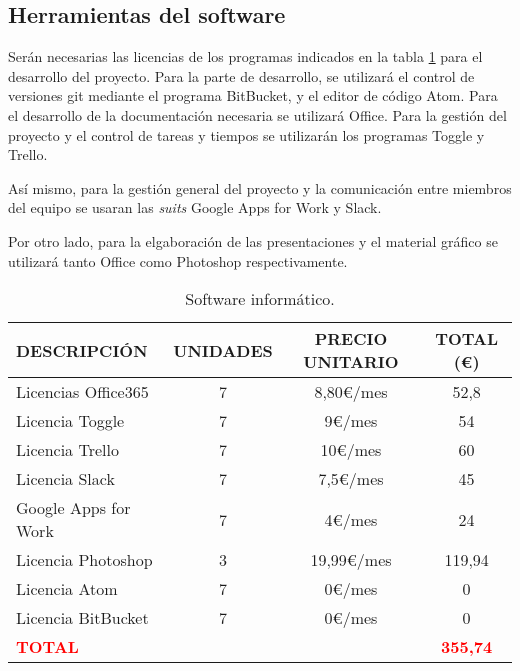 \subsection{Herramientas del software}
\par Serán necesarias las licencias de los programas indicados en la tabla \ref{tab:software} para el desarrollo del proyecto. Para la parte de desarrollo, se utilizará el control de versiones git mediante el programa BitBucket, y el editor de código Atom. Para el desarrollo de la documentación necesaria se utilizará Office. Para la gestión del proyecto y el control de tareas y tiempos se utilizarán los programas Toggle y Trello.
\par Así mismo, para la gestión general del proyecto y la comunicación entre miembros del equipo se usaran las \textit{suits} Google Apps for Work y Slack.
\par Por otro lado, para la elgaboración de las presentaciones y el material gráfico se utilizará tanto Office como Photoshop respectivamente.


\begin{table}[H]
\begin{center}
\begin{tabular}{l c c c}
\textbf{DESCRIPCIÓN} & \textbf{UNIDADES} & \textbf{PRECIO UNITARIO} & \textbf{TOTAL (\euro)}\\ \hline \hline
Licencias Office365 & 7 & 8,80\euro/mes & 52,8\\
Licencia Toggle & 7 & 9\euro/mes & 54\\
Licencia Trello & 7 & 10\euro/mes & 60\\
Licencia Slack & 7 & 7,5\euro/mes & 45\\
Google Apps for Work & 7 & 4\euro/mes & 24\\
Licencia Photoshop & 3 & 19,99\euro/mes & 119,94\\
Licencia Atom & 7 & 0\euro/mes & 0\\
Licencia BitBucket & 7 & 0\euro/mes & 0\\ \hline \hline
\textcolor{red}{\textbf{TOTAL}} & & & \textcolor{red}{\textbf{355,74}}\\ \hline
\end{tabular}
\caption{Software informático.}
\label{tab:software}
\end{center}
\end{table}




